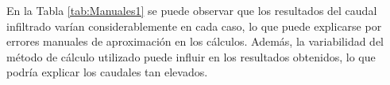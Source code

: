En la Tabla \ref{tab:Manuales1} se puede observar que los resultados del caudal infiltrado varían considerablemente en cada caso, lo que puede explicarse por errores manuales de aproximación en los cálculos. Además, la variabilidad del método de cálculo utilizado puede influir en los resultados obtenidos, lo que podría explicar los caudales tan elevados.
